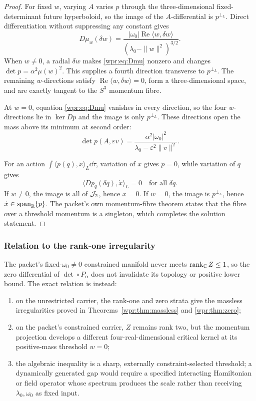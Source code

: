 \begin{proof}
For fixed \(w\), varying \(A\) varies \(p\) through the
three-dimensional fixed-determinant future hyperboloid, so the image
of the \(A\)-differential is \(p^{\perp_L}\).  Direct differentiation
without suppressing any constant gives
\begin{equation}
 D\mu_w(\delta w)
 =
 \frac{|\omega_0|\operatorname{Re}\langle w,\delta w\rangle}
 {(\lambda_0-\|w\|^2)^{3/2}}.
 \label{wpr:eq:Dmu}
\end{equation}
When \(w\neq0\), a radial \(\delta w\) makes
\eqref{wpr:eq:Dmu} nonzero and changes \(\det p=\alpha^2\mu(w)^2\).
This supplies a fourth direction transverse to \(p^{\perp_L}\).
The remaining \(w\)-directions satisfy
\(\operatorname{Re}\langle w,\delta w\rangle=0\), form a
three-dimensional space, and are exactly tangent to the \(S^3\)
momentum fibre.

At \(w=0\), equation \eqref{wpr:eq:Dmu} vanishes in every direction,
so the four \(w\)-directions lie in \(\ker Dp\) and the image is only
\(p^{\perp_L}\).  These directions open the mass above its minimum at
second order:
\[
 \det p(A,\varepsilon v)
 =
 \frac{\alpha^2|\omega_0|^2}
 {\lambda_0-\varepsilon^2\|v\|^2}.
\]

For an action \(\int\langle p(q),\dot x\rangle_L\dd\tau\), variation
of \(x\) gives \(\dot p=0\), while variation of \(q\) gives
\[
 \langle Dp_q(\delta q),\dot x\rangle_L=0
 \quad\text{for all }\delta q.
\]
If \(w\neq0\), the image is all of \(\mathcal J_2\), hence \(\dot x=0\).
If \(w=0\), the image is \(p^{\perp_L}\), hence
\(\dot x\in\operatorname{span}_{\mathbb R}\{p\}\).  The packet's own momentum-fibre theorem
states that the fibre over a threshold momentum is a singleton, which
completes the solution statement.
\end{proof}

\subsubsection{Relation to the rank-one irregularity}

The packet's fixed-\(\omega_0\neq0\) constrained manifold never meets
\(\operatorname{rank}_{\mathbb C} Z\leq1\), so the zero differential of
\(\det\circ P_\alpha\) does not invalidate its topology or positive
lower bound.  The exact relation is instead:
\begin{enumerate}
\item on the unrestricted carrier, the rank-one and zero strata give
the massless irregularities proved in
Theorems~\ref{wpr:thm:massless} and \ref{wpr:thm:zero};
\item on the packet's constrained carrier, \(Z\) remains rank two, but
the momentum projection develops a different four-real-dimensional
critical kernel at its positive-mass threshold \(w=0\);
\item the algebraic inequality is a sharp, externally
constraint-selected threshold; a dynamically generated gap would
require a specified interacting Hamiltonian or field operator whose
spectrum produces the scale rather than receiving
\(\lambda_0,\omega_0\) as fixed input.
\end{enumerate}

\endgroup
